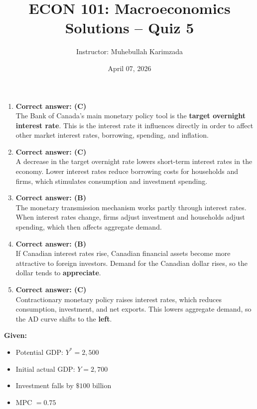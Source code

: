 \documentclass[12pt]{article}
\title{ECON 101: Macroeconomics \\ Solutions -- Quiz 5}
\author{Instructor: Muhebullah Karimzada}
\date{April 07,  2026}
\begin{document}
\maketitle

\begin{enumerate}[label=\textbf{\arabic*.}]

\item \textbf{Correct answer: (C)}\\
The Bank of Canada's main monetary policy tool is the \textbf{target overnight interest rate}. This is the interest rate it influences directly in order to affect other market interest rates, borrowing, spending, and inflation.

\item \textbf{Correct answer: (C)}\\
A decrease in the target overnight rate lowers short-term interest rates in the economy. Lower interest rates reduce borrowing costs for households and firms, which stimulates consumption and investment spending.

\item \textbf{Correct answer: (B)}\\
The monetary transmission mechanism works partly through interest rates. When interest rates change, firms adjust investment and households adjust spending, which then affects aggregate demand.

\item \textbf{Correct answer: (B)}\\
If Canadian interest rates rise, Canadian financial assets become more attractive to foreign investors. Demand for the Canadian dollar rises, so the dollar tends to \textbf{appreciate}.

\item \textbf{Correct answer: (C)}\\
Contractionary monetary policy raises interest rates, which reduces consumption, investment, and net exports. This lowers aggregate demand, so the AD curve shifts to the \textbf{left}.

\end{enumerate}


\textbf{Given:}
\begin{itemize}
    \item Potential GDP: \(Y^* = 2{,}500\)
    \item Initial actual GDP: \(Y = 2{,}700\)
    \item Investment falls by \(\$100\) billion
    \item MPC \(= 0.75\)
\end{itemize}
\end{document}
